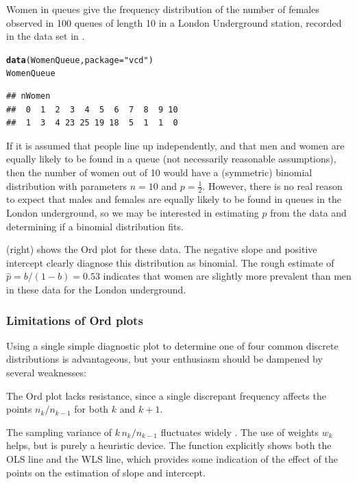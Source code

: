 \documentclass[11pt]{book}\usepackage[]{graphicx}\usepackage[]{color}
\makeatletter
\newcommand{\hlstr}[1]{\textcolor[rgb]{0.192,0.494,0.8}{#1}}%
\newcommand{\hlstd}[1]{\textcolor[rgb]{0.345,0.345,0.345}{#1}}%
\newcommand{\hlkwc}[1]{\textcolor[rgb]{0.333,0.667,0.333}{#1}}%
\newcommand{\hlkwd}[1]{\textcolor[rgb]{0.737,0.353,0.396}{\textbf{#1}}}%
\newenvironment{kframe}{%
 \def\at@end@of@kframe{}%
 \ifinner\ifhmode%
  \def\at@end@of@kframe{\end{minipage}}%
  \begin{minipage}{\columnwidth}%
 \fi\fi%
 \def\FrameCommand##1{\hskip\@totalleftmargin \hskip-\fboxsep
 \colorbox{shadecolor}{##1}\hskip-\fboxsep
     \hskip-\linewidth \hskip-\@totalleftmargin \hskip\columnwidth}%
 \MakeFramed {\advance\hsize-\width
   \@totalleftmargin\z@ \linewidth\hsize
   \@setminipage}}%
 {\par\unskip\endMakeFramed%
 \at@end@of@kframe}
\newenvironment{knitrout}{}{} %
\renewenvironment{knitrout}{\small\renewcommand{\baselinestretch}{.85}}{} %
\makeatother
\begin{document}
\begin{Example}[queues]{Women in queues}
\citet{JinkinsonSlater:81,HoaglinTukey:85}
give the frequency distribution of the number of females observed in 100
queues of length 10 in a London Underground station, recorded
in the data set  in .
\begin{knitrout}
\color{fgcolor}\begin{kframe}
\begin{alltt}
\hlkwd{data}\hlstd{(WomenQueue,} \hlkwc{package}\hlstd{=}\hlstr{"vcd"}\hlstd{)}
\hlstd{WomenQueue}
\end{alltt}
\begin{verbatim}
## nWomen
##  0  1  2  3  4  5  6  7  8  9 10 
##  1  3  4 23 25 19 18  5  1  1  0
\end{verbatim}
\end{kframe}
\end{knitrout}


If it is assumed that people line up independently, and that
men and women are equally likely to be found in a queue
(not necessarily reasonable assumptions),
then the number of women out of 10
would have a (symmetric) binomial distribution with parameters $n=10$ and
$p=\frac12$.
However, there is no real reason to expect that males and females are
equally likely to be found in queues in the London underground,
so we may be interested in estimating $p$ from the data
and determining if a binomial distribution fits.

 (right) shows the Ord plot for these data.
The negative slope and positive intercept clearly diagnose this distribution
as binomial.  The rough estimate of $\hat{p} = b/(1-b) = 0.53$ indicates that
women are slightly more prevalent than men in these data for the London 
underground. 
\end{Example}

\subsubsection{Limitations of Ord plots}
Using a single simple diagnostic plot to determine one of four common discrete
distributions is advantageous, but your enthusiasm should be
dampened by several weaknesses:

\begin{itemize*}
\item The Ord plot lacks resistance, since a single discrepant
       frequency affects the points $n_k / n_{k-1}$
       for both \(k\) and \(k  +  1\).

\item The sampling variance of \(k \,  n_k /  n_{k-1}\) fluctuates
       widely
       \citep{HoaglinTukey:85,JinkinsonSlater:81}.  
       The use of weights \(w_k\) helps, but is purely a
       heuristic device. The  function explicitly shows both
       the OLS line and the WLS line, which provides some indication of the
       effect of the points on the estimation of slope and intercept.
\end{itemize*}
\end{document}
